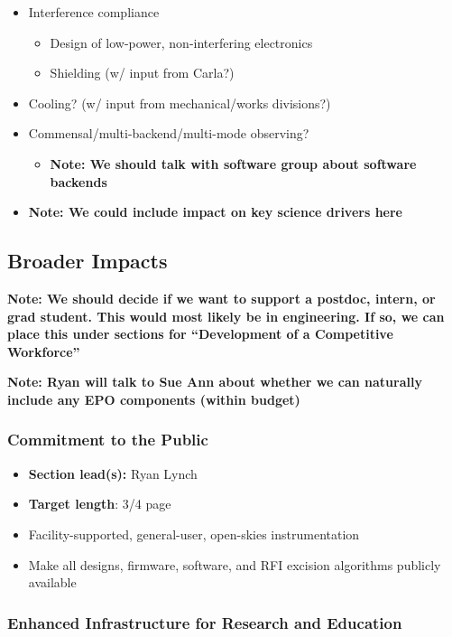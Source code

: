 \documentclass[10pt]{NSF}
\begin{document}
\begin{itemize}
\begin{itemize}
  \end{itemize}
\item{Interference compliance}
  \begin{itemize}
  \item{Design of low-power, non-interfering electronics}
  \item{Shielding (w/ input from Carla?)}
  \end{itemize}
\item{Cooling? (w/ input from mechanical/works divisions?)}
\item{Commensal/multi-backend/multi-mode observing?}
  \begin{itemize}
  \item{\textbf{Note: We should talk with software group about
        software backends}}
  \end{itemize}
\item{\textbf{Note: We could include impact on key science drivers
      here}}
\end{itemize}

\subsection{Broader Impacts}
\label{sec:BI}

\textbf{Note: We should decide if we want to support a postdoc,
  intern, or grad student.  This would most likely be in engineering.
  If so, we can place this under sections for ``Development of a
  Competitive Workforce''}

\textbf{Note: Ryan will talk to Sue Ann about whether we can naturally
  include any EPO components (within budget)}

\subsubsection{Commitment to the Public}
\label{sec:commitment}

\begin{itemize}
\item{\textbf{Section lead(s):} Ryan Lynch}
\item{\textbf{Target length}: 3/4 page}
\item{Facility-supported, general-user, open-skies instrumentation}
\item{Make all designs, firmware, software, and RFI excision
    algorithms publicly available}
\end{itemize}

\subsubsection{Enhanced Infrastructure for Research and Education}
\label{sec:infrastructure}
\end{document}
